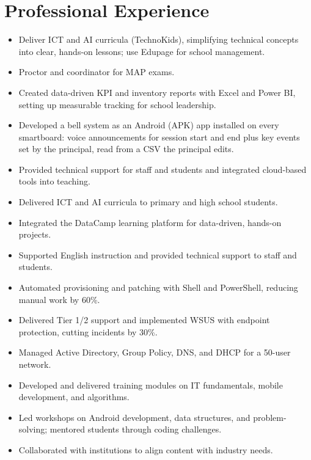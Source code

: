 \documentclass[a4paper,10pt]{article}
\begin{document}
\section*{Professional Experience}
\begin{itemize}
  \item Deliver ICT and AI curricula (TechnoKids), simplifying technical concepts into clear, hands-on lessons; use Edupage for school management.
  \item Proctor and coordinator for MAP exams.
  \item Created data-driven KPI and inventory reports with Excel and Power BI, setting up measurable tracking for school leadership.
  \item Developed a bell system as an Android (APK) app installed on every smartboard: voice announcements for session start and end plus key events set by the principal, read from a CSV the principal edits.
  \item Provided technical support for staff and students and integrated cloud-based tools into teaching.
\end{itemize}
\begin{itemize}
  \item Delivered ICT and AI curricula to primary and high school students.
  \item Integrated the DataCamp learning platform for data-driven, hands-on projects.
  \item Supported English instruction and provided technical support to staff and students.
\end{itemize}
\begin{itemize}
  \item Automated provisioning and patching with Shell and PowerShell, reducing manual work by 60\%.
  \item Delivered Tier 1/2 support and implemented WSUS with endpoint protection, cutting incidents by 30\%.
  \item Managed Active Directory, Group Policy, DNS, and DHCP for a 50-user network.
\end{itemize}
\begin{itemize}
  \item Developed and delivered training modules on IT fundamentals, mobile development, and algorithms.
  \item Led workshops on Android development, data structures, and problem-solving; mentored students through coding challenges.
  \item Collaborated with institutions to align content with industry needs.
\end{itemize}
\end{document}
